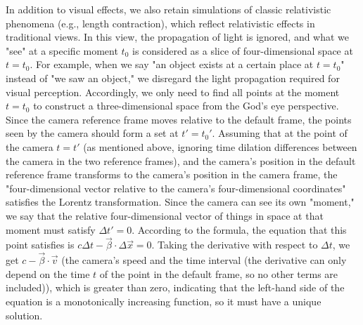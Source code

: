 \documentclass{article}
\begin{document}
In addition to visual effects, we also retain simulations of classic relativistic phenomena (e.g., length contraction), which reflect relativistic effects in traditional views. In this view, the propagation of light is ignored, and what we "see" at a specific moment $t_0$ is considered as a slice of four-dimensional space at $t=t_0$. For example, when we say "an object exists at a certain place at $t=t_0$" instead of "we saw an object," we disregard the light propagation required for visual perception. Accordingly, we only need to find all points at the moment $t=t_0$ to construct a three-dimensional space from the God’s eye perspective. Since the camera reference frame moves relative to the default frame, the points seen by the camera should form a set at $t' = t_0'$. Assuming that at the point of the camera $t=t'$ (as mentioned above, ignoring time dilation differences between the camera in the two reference frames), and the camera’s position in the default reference frame transforms to the camera’s position in the camera frame, the "four-dimensional vector relative to the camera's four-dimensional coordinates" satisfies the Lorentz transformation. Since the camera can see its own "moment," we say that the relative four-dimensional vector of things in space at that moment must satisfy $\Delta t' = 0$. According to the formula, the equation that this point satisfies is $c\Delta t - \vec{\beta} \cdot \Delta \vec{x} = 0$. Taking the derivative with respect to $\Delta t$, we get $c - \vec{\beta} \cdot \vec{v}$ (the camera’s speed and the time interval (the derivative can only depend on the time $t$ of the point in the default frame, so no other terms are included)), which is greater than zero, indicating that the left-hand side of the equation is a monotonically increasing function, so it must have a unique solution.
\end{document}
